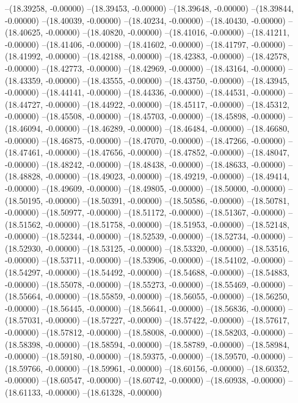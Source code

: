 --(18.39258, -0.00000)
--(18.39453, -0.00000)
--(18.39648, -0.00000)
--(18.39844, -0.00000)
--(18.40039, -0.00000)
--(18.40234, -0.00000)
--(18.40430, -0.00000)
--(18.40625, -0.00000)
--(18.40820, -0.00000)
--(18.41016, -0.00000)
--(18.41211, -0.00000)
--(18.41406, -0.00000)
--(18.41602, -0.00000)
--(18.41797, -0.00000)
--(18.41992, -0.00000)
--(18.42188, -0.00000)
--(18.42383, -0.00000)
--(18.42578, -0.00000)
--(18.42773, -0.00000)
--(18.42969, -0.00000)
--(18.43164, -0.00000)
--(18.43359, -0.00000)
--(18.43555, -0.00000)
--(18.43750, -0.00000)
--(18.43945, -0.00000)
--(18.44141, -0.00000)
--(18.44336, -0.00000)
--(18.44531, -0.00000)
--(18.44727, -0.00000)
--(18.44922, -0.00000)
--(18.45117, -0.00000)
--(18.45312, -0.00000)
--(18.45508, -0.00000)
--(18.45703, -0.00000)
--(18.45898, -0.00000)
--(18.46094, -0.00000)
--(18.46289, -0.00000)
--(18.46484, -0.00000)
--(18.46680, -0.00000)
--(18.46875, -0.00000)
--(18.47070, -0.00000)
--(18.47266, -0.00000)
--(18.47461, -0.00000)
--(18.47656, -0.00000)
--(18.47852, -0.00000)
--(18.48047, -0.00000)
--(18.48242, -0.00000)
--(18.48438, -0.00000)
--(18.48633, -0.00000)
--(18.48828, -0.00000)
--(18.49023, -0.00000)
--(18.49219, -0.00000)
--(18.49414, -0.00000)
--(18.49609, -0.00000)
--(18.49805, -0.00000)
--(18.50000, -0.00000)
--(18.50195, -0.00000)
--(18.50391, -0.00000)
--(18.50586, -0.00000)
--(18.50781, -0.00000)
--(18.50977, -0.00000)
--(18.51172, -0.00000)
--(18.51367, -0.00000)
--(18.51562, -0.00000)
--(18.51758, -0.00000)
--(18.51953, -0.00000)
--(18.52148, -0.00000)
--(18.52344, -0.00000)
--(18.52539, -0.00000)
--(18.52734, -0.00000)
--(18.52930, -0.00000)
--(18.53125, -0.00000)
--(18.53320, -0.00000)
--(18.53516, -0.00000)
--(18.53711, -0.00000)
--(18.53906, -0.00000)
--(18.54102, -0.00000)
--(18.54297, -0.00000)
--(18.54492, -0.00000)
--(18.54688, -0.00000)
--(18.54883, -0.00000)
--(18.55078, -0.00000)
--(18.55273, -0.00000)
--(18.55469, -0.00000)
--(18.55664, -0.00000)
--(18.55859, -0.00000)
--(18.56055, -0.00000)
--(18.56250, -0.00000)
--(18.56445, -0.00000)
--(18.56641, -0.00000)
--(18.56836, -0.00000)
--(18.57031, -0.00000)
--(18.57227, -0.00000)
--(18.57422, -0.00000)
--(18.57617, -0.00000)
--(18.57812, -0.00000)
--(18.58008, -0.00000)
--(18.58203, -0.00000)
--(18.58398, -0.00000)
--(18.58594, -0.00000)
--(18.58789, -0.00000)
--(18.58984, -0.00000)
--(18.59180, -0.00000)
--(18.59375, -0.00000)
--(18.59570, -0.00000)
--(18.59766, -0.00000)
--(18.59961, -0.00000)
--(18.60156, -0.00000)
--(18.60352, -0.00000)
--(18.60547, -0.00000)
--(18.60742, -0.00000)
--(18.60938, -0.00000)
--(18.61133, -0.00000)
--(18.61328, -0.00000)
